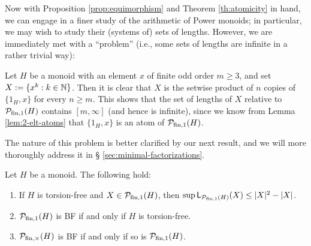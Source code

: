 Now with Proposition \ref{prop:equimorphism} and Theorem \ref{th:atomicity} in hand, we can engage in a finer study of the arithmetic of Power monoids; in particular, we may wish to study their (systems of) sets of lengths. However, we are immediately met with a ``problem'' (i.e., some sets of lengths are infinite in a rather trivial way):
%
\begin{eg}\label{unbounded-fzn}
	Let $H$ be a monoid with an element $x$ of finite odd order $m \ge 3$, and set $X := \{x^k : k \in \mathbb{N} \}$. Then it is clear that $X$ is the setwise product of $n$ copies of $\{1_H, x\}$ for every $n \ge m$. This shows that the set of lengths of $X$ relative to $\mathcal{P}_{\textrm{fin}, 1}(H)$ contains $[ m, \infty ]$ (and hence is infinite), since we know from Lemma \ref{lem:2-elt-atoms} that $\{1_H, x\}$ is an atom of $\mathcal{P}_{\textrm{fin}, 1}(H)$.
\end{eg}
%
The nature of this problem is better clarified by our next result, and we will more thoroughly address it in \S{ }\ref{sec:minimal-factorizations}.
%
\begin{thm}\label{thm:BF-torsion}
Let $H$ be a monoid. The following hold:
\begin{enumerate}[label={\rm (\roman{*})}]
\item\label{it:thm:BF-torsion(i)} If $H$ is torsion-free and $X\in \mathcal{P}_{\textrm{fin}, 1}(H)$, then $\sup \mathsf{L}_{\mathcal P_{\textrm{fin}, 1}(H)}(X) \le |X|^2-|X|$.
\item\label{it:thm:BF-torsion(ii)} $\mathcal{P}_{\textrm{fin}, 1}(H)$ is \textup{BF} if and only if $H$ is torsion-free.
\item\label{it:thm:BF-torsion(iii)} $\mathcal{P}_{\textrm{fin}, \times}(H)$ is \textup{BF} if and only if so is $\mathcal P_{\textrm{fin}, 1}(H)$.
\end{enumerate}
\end{thm}

